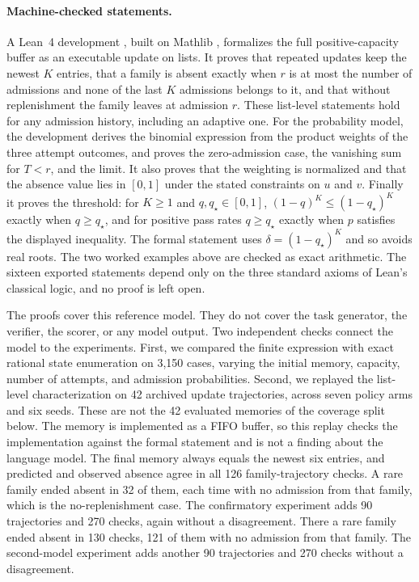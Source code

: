 \documentclass[11pt]{article}
\begin{document}
\paragraph{Machine-checked statements.} A Lean~4 development
\cite{lean4}, built on Mathlib \cite{mathlib}, formalizes the full
positive-capacity buffer as an executable update on lists. It proves
that repeated updates keep the newest $K$ entries, that a family is
absent exactly when $r$ is at most the number of admissions and none
of the last $K$ admissions belongs to it, and that without
replenishment the family leaves at admission $r$. These list-level
statements hold for any admission history, including an adaptive one.
For the probability model, the development derives the binomial
expression from the product weights of the three attempt outcomes,
and proves the zero-admission case, the vanishing sum for $T<r$, and
the limit. It also proves that the weighting is normalized and that
the absence value lies in $[0,1]$ under the stated constraints on $u$
and $v$. Finally it proves the threshold: for $K\ge 1$ and
$q,q_\star\in[0,1]$, $(1-q)^K\le(1-q_\star)^K$ exactly when
$q\ge q_\star$, and for positive pass rates $q\ge q_\star$ exactly when
$p$ satisfies the displayed inequality. The formal statement uses
$\delta=(1-q_\star)^K$ and so avoids real roots. The two worked
examples above are checked as exact arithmetic. The sixteen exported
statements depend only on the three standard axioms of Lean's
classical logic, and no proof is left open.

The proofs cover this reference model. They do not cover the task
generator, the verifier, the scorer, or any model output. Two
independent checks connect the model to the experiments. First, we
compared the finite expression with exact rational state enumeration
on 3,150 cases, varying the initial memory, capacity, number of
attempts, and admission probabilities. Second, we replayed the
list-level characterization on 42 archived update trajectories,
across seven policy arms and six seeds. These are not the 42 evaluated
memories of the coverage split below. The memory is implemented as a
FIFO buffer, so this replay checks the implementation against the
formal statement and is not a finding about the language model. The
final memory always equals
the newest six entries, and predicted and observed absence agree in
all 126 family-trajectory checks. A rare family ended absent in 32 of
them, each time with no admission from that family, which is the
no-replenishment case. The confirmatory experiment adds 90 trajectories
and 270 checks, again without a disagreement. There a rare family
ended absent in 130 checks, 121 of them with no admission from that
family. The second-model experiment adds another 90 trajectories and
270 checks without a disagreement.
\end{document}
